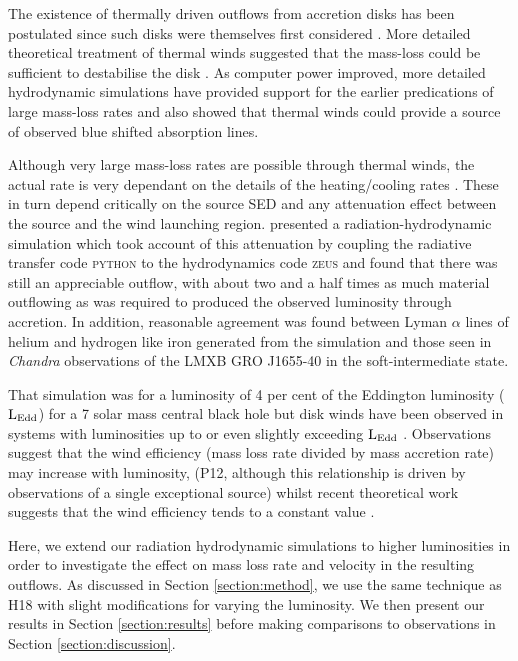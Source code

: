 \documentclass[a4paper,fleqn,usenatbib]{mnras}
\begin{document}
The existence of thermally driven outflows from accretion disks has been postulated since such disks were themselves
first considered \citep{1973A&A....24..337S}. More detailed theoretical treatment of thermal winds \citep{1983ApJ...271...70B} suggested that the mass-loss could be sufficient to destabilise the disk \citep{1986ApJ...306...90S}.
As computer power improved, more detailed hydrodynamic simulations  \citep{1996ApJ...461..767W,2006ApJ...652L.117N,2010ApJ...719..515L,2015ApJ...807..107H} have provided support for the earlier predications of large mass-loss rates and also showed that thermal winds could provide a source of observed blue shifted absorption lines.

Although very large mass-loss rates are possible through thermal winds, the actual rate is very 
dependant on the details
 of the heating/cooling rates  \citep{2017ApJ...836...42H}. These 
in turn depend critically on the source SED \citep{2017MNRAS.467.4161D} and any attenuation effect between the source and the wind
launching region. \citet[hereafter H18]{2018MNRAS.479.3651H} presented a radiation-hydrodynamic simulation which 
took account
of this attenuation by coupling the radiative transfer code  \textsc{python} to the hydrodynamics code \textsc{zeus} and 
found that there was still an appreciable outflow, with about two and a half times as much material outflowing as was required
to produced the observed luminosity through accretion. In addition, reasonable agreement was found between 
Lyman $\alpha$ lines of helium and hydrogen like iron generated from the simulation and those seen in \emph{Chandra} 
observations of the LMXB GRO J1655-40 in the soft-intermediate state. 

That simulation was for a luminosity of 4 per cent of the Eddington luminosity  ($\rm{L_{Edd}}$) for a 7 solar mass 
central black hole but disk winds have been observed in systems with luminosities up to or even slightly exceeding 
$\rm{L_{Edd}}$ \citep[][herafter P12]{2012MNRAS.422L..11P}.  Observations
suggest that the wind efficiency (mass loss rate divided by mass accretion rate) may increase with luminosity, 
(P12, although this relationship is driven by observations of a single exceptional source) whilst recent theoretical work 
suggests that the wind efficiency tends to a constant value \citep[][hereafter D18]{2018MNRAS.473..838D}.

Here, we extend our radiation hydrodynamic simulations to higher 
luminosities in order to investigate the effect on mass loss rate and velocity in the resulting outflows. 
As discussed in Section \ref{section:method}, we  use the same technique as H18 with slight modifications for varying the luminosity.
We then present our results in Section \ref{section:results} before making comparisons to observations in Section \ref{section:discussion}.
\end{document}
